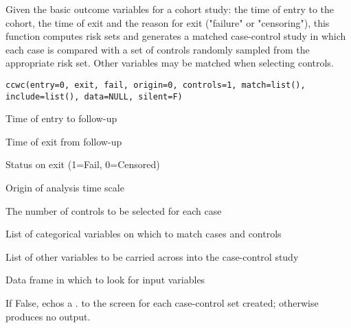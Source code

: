 \begin{Description}\relax
Given the basic outcome variables for a cohort study: the time of entry 
to the cohort, the time of exit and the reason for exit ("failure" or
"censoring"), this function computes risk sets and generates a matched
case-control study in which each case is compared with a set of controls
randomly sampled from the appropriate risk set. Other variables may be
matched when selecting controls.
\end{Description}
\begin{Usage}
\begin{verbatim}
ccwc(entry=0, exit, fail, origin=0, controls=1, match=list(), include=list(), data=NULL, silent=F)
\end{verbatim}
\end{Usage}
\begin{Arguments}
\begin{ldescription}
\item[\code{entry}] Time of entry to follow-up

\item[\code{exit}] Time of exit from follow-up

\item[\code{fail}] Status on exit (1=Fail, 0=Censored)

\item[\code{origin}] Origin of analysis time scale

\item[\code{controls}] The number of controls to be selected for each case

\item[\code{match}] List of categorical variables on which to match cases and controls

\item[\code{include}] List of other variables to be carried across into the case-control
study

\item[\code{data}] Data frame in which to look for input variables

\item[\code{silent}] If  False, echos a . to the screen for each case-control set
created; otherwise produces no output.

\end{ldescription}
\end{Arguments}
